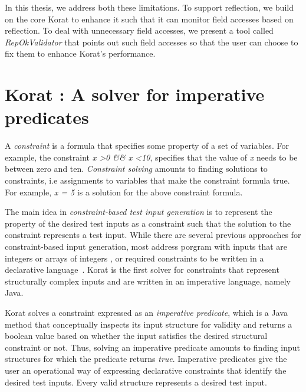\para
In this thesis, we address both these limitations.  To support reflection, we build on the core Korat to enhance it such that it can monitor field accesses based on reflection.  To deal with unnecessary field accesses, we present a tool called \emph{RepOkValidator} that points out such field accesses so that the user can choose to fix them to enhance Korat’s performance.


\section{Korat : A solver for imperative predicates}

A \emph{constraint} is a formula that specifies some property of a set
of variables. For example, the constraint \emph{x \textgreater 0 \&\&
  x \textless 10}, specifies that the value of \emph{x} needs to be
between zero and ten. \emph{Constraint solving} amounts to finding
solutions to constraints, i.e assignments to variables that make the
constraint formula true. For example, \emph{x = 5} is a solution for
the above constraint formula. 

The main idea in \emph{constraint-based test input generation} is to
represent the property of the desired test inputs as a constraint such
that the solution to the constraint represents a test input. While
there are several previous approaches for constraint-based input
generation, most address porgram with inputs that are integers or
arrays of integers
\cite{demilli1991constraint,huang1975approach,king1976symbolic,korel1996automated},
or required constraints to be written in a declarative
language~\cite{TestEra}. Korat \cite{boyapati2002korat} is the first
solver for constraints that represent structurally complex inputs and
are written in an imperative language, namely Java.

\para Korat solves a constraint expressed as an \emph{imperative
  predicate}, which is a Java method that conceptually inspects its
input structure for validity and returns a boolean value based on
whether the input satisfies the desired structural constraint or not.
Thus, solving an imperative predicate amounts to finding input
structures for which the predicate returns \emph{true}.  Imperative
predicates give the user an operational way of expressing declarative
constraints that identify the desired test inputs.  Every valid
structure represents a desired test input.

